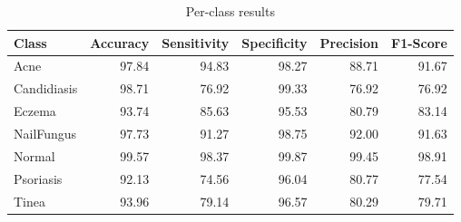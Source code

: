 \begin{table}
\caption{Per-class results}
\label{tab:results}
\begin{tabular}{lrrrrr}
\toprule
Class & Accuracy & Sensitivity & Specificity & Precision & F1-Score \\
\midrule
Acne & 97.84 & 94.83 & 98.27 & 88.71 & 91.67 \\
Candidiasis & 98.71 & 76.92 & 99.33 & 76.92 & 76.92 \\
Eczema & 93.74 & 85.63 & 95.53 & 80.79 & 83.14 \\
NailFungus & 97.73 & 91.27 & 98.75 & 92.00 & 91.63 \\
Normal & 99.57 & 98.37 & 99.87 & 99.45 & 98.91 \\
Psoriasis & 92.13 & 74.56 & 96.04 & 80.77 & 77.54 \\
Tinea & 93.96 & 79.14 & 96.57 & 80.29 & 79.71 \\
\bottomrule
\end{tabular}
\end{table}
